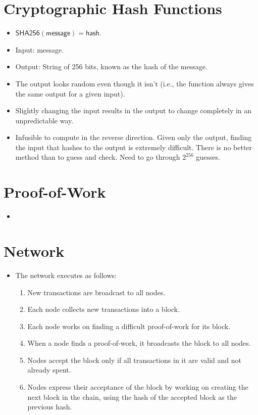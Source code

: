 \documentclass{article}
\begin{document}
\section{Cryptographic Hash Functions}

\begin{itemize}
  \item $\mathsf{SHA256(message) = hash}$.
  \item Input: message.
  \item Output: String of 256 bits, known as the hash of the message.
  \item The output looks random even though it isn't (i.e., the function always
    gives the same output for a given input).
  \item Slightly changing the input results in the output to change completely
    in an unpredictable way.
  \item Infusible to compute in the reverse direction. Given only the output,
    finding the input that hashes to the output is extremely difficult. There is
    no better method than to guess and check. Need to go through $2^{256}$
    guesses.
\end{itemize}

\section{Proof-of-Work}

\begin{itemize}
  \item %
\end{itemize}

\section{Network}

\begin{itemize}
  \item The network executes as follows:
    \begin{enumerate}
      \item New transactions are broadcast to all nodes.
      \item Each node collects new transactions into a block.
      \item Each node works on finding a difficult proof-of-work for its block.
      \item When a node finds a proof-of-work, it broadcasts the block to all
        nodes.
      \item Nodes accept the block only if all transactions in it are valid and
        not already spent.
      \item Nodes express their acceptance of the block by working on creating
        the next block in the chain, using the hash of the accepted block as the
        previous hash.
    \end{enumerate}
\end{itemize}
\end{document}

